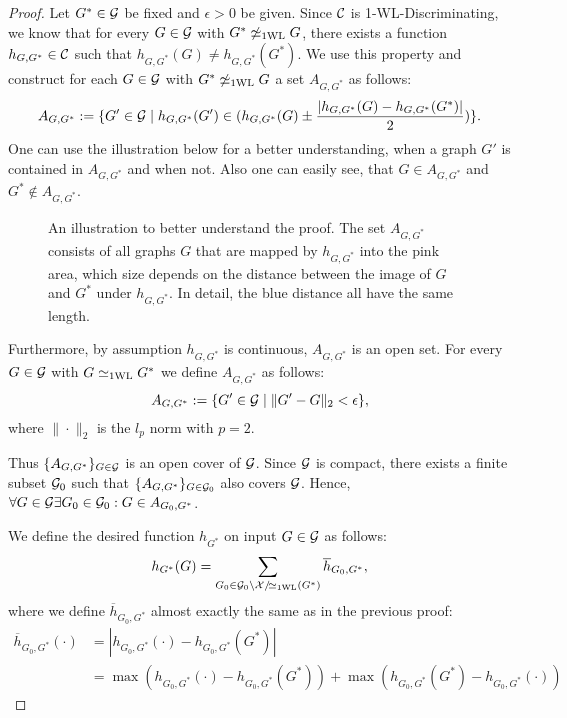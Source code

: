 \begin{proof}
    Let $G^* \in \mathcal{G}$ be fixed and $\epsilon > 0$ be given. Since $\mathcal{C}$ is 1-\!WL-Discriminating, we know that for every $G \in \mathcal{G}$ with $G^* \not\simeq_{\text{1WL}} G$, there exists a function $h_{G, G^*} \in \mathcal{C}$ such that $h_{G, G^*}(G) \neq h_{G, G^*}(G^*)$. We use this property and construct for each $G \in \mathcal{G}$ with $G^* \not\simeq_{\text{1WL}} G$ a set $A_{G, G^*}$ as follows:
    \begin{equation*}
        A_{G, G^*} := \{ G' \in \mathcal{G} \mid h_{G, G^*}(G') \in (h_{G, G^*}(G) \pm \frac{|h_{G, G^*}(G) - h_{G, G^*}(G^*)|}{2})\}.
    \end{equation*}
    One can use the illustration below for a better understanding, when a graph $G'$ is contained in $A_{G, G^*}$ and when not. Also one can easily see, that $G \in A_{G, G^*}$ and $G^* \not\in A_{G, G^*}$.

    \begin{figure}[H]
        \centering
        
        \caption{An illustration to better understand the proof. The set $A_{G, G^*}$ consists of all graphs $G$ that are mapped by $h_{G, G^*}$ into the pink area, which size depends on the distance between the image of $G$ and $G^*$ under $h_{G, G^*}$. In detail, the blue distance all have the same length.}
        \label{fig:proof_continous1}
    \end{figure}

   Furthermore, by assumption $h_{G, G^*}$ is continuous, $A_{G, G^*}$ is an open set. For every $G \in \mathcal{G}$ with $G \simeq_{\text{1WL}} G^*$ we define $A_{G, G^*}$ as follows:
    \begin{equation*}
        A_{G, G^*} := \{ G' \in \mathcal{G} \mid \| G' - G \|_2 < \epsilon\},
    \end{equation*}
    where $\|\cdot\|_2$ is the $l_p$ norm with $p=2$.

    Thus $\{ A_{G, G^*} \}_{G \in \mathcal{G}}$ is an open cover of $\mathcal{G}$. Since $\mathcal{G}$ is compact, there exists a finite subset $\mathcal{G}_0$ such that $\{ A_{G, G^*} \}_{G \in \mathcal{G}_0}$ also covers $\mathcal{G}$. Hence, $\forall G \in \mathcal{G} \exists G_0 \in \mathcal{G}_0: G \in A_{G_0, G^*}$.


    We define the desired function $h_{G^*}$ on input $G \in \mathcal{G}$ as follows:
    \begin{equation*}
        h_{G^*}(G) = \sum_{G_0 \in \mathcal{G}_0 \setminus \mathcal{X}/\!{\simeq_{\text{1WL}}}(G^*)} \overline{h}_{G_0, G^*},
    \end{equation*}
    where we define $\overline{h}_{G_0, G^*}$ almost exactly the same as in the previous proof:
    \begin{align*}
        \overline{h}_{G_0, G^*}(\cdot) &= |h_{G_0, G^*}(\cdot) - h_{G_0, G^*}(G^*)| \\
        &= \max(h_{G_0, G^*}(\cdot) - h_{G_0, G^*}(G^*)) + \max(h_{G_0, G^*}(G^*) - h_{G_0, G^*}(\cdot))
    \end{align*}


\end{proof}
